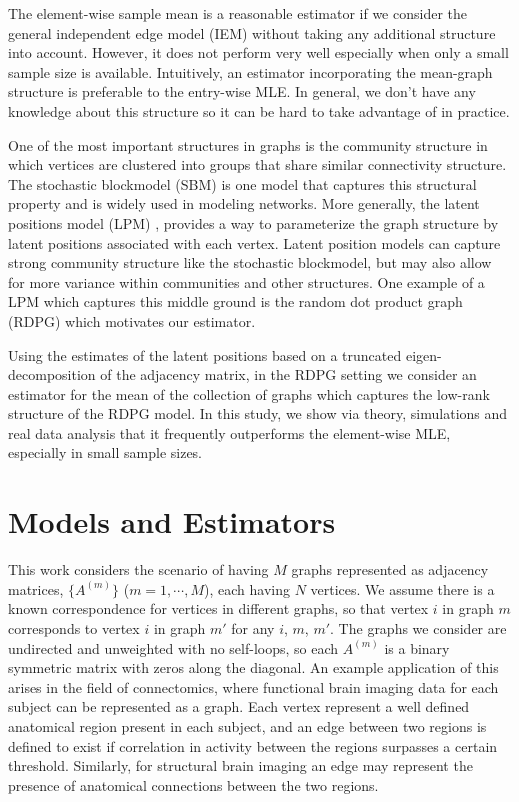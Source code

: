 \documentclass[a4paper]{article}
\begin{document}
The element-wise sample mean is a reasonable estimator if we consider the general independent edge model (IEM) \cite{bollobas2007phase} without taking any additional structure into account. 
However, it does not perform very well especially when only a small sample size is available.
Intuitively, an estimator incorporating the mean-graph structure is preferable to the entry-wise MLE. 
In general, we don't have any knowledge about this structure so it can be hard to take advantage of in practice.



One of the most important structures in graphs is the community structure in which vertices are clustered into groups that share similar connectivity structure. The stochastic blockmodel (SBM) \cite{holland1983stochastic} is one model that captures this structural property and is widely used in modeling networks.
More generally, the latent positions model (LPM) \cite{hoff2002latent}, provides a way to parameterize the graph structure by latent positions associated with each vertex. 
Latent position models can capture strong community structure like the stochastic blockmodel, but may also allow for more variance within communities and other structures.
One example of a LPM which captures this middle ground is the random dot product graph (RDPG) \cite{young2007random, nickel2007random} which motivates our estimator. 

Using the estimates of the latent positions based on a truncated eigen-decomposition of the adjacency matrix,  in the RDPG setting we consider an estimator for the mean of the collection of graphs which captures the low-rank structure of the RDPG model. In this study, we show via theory, simulations and real data analysis that it frequently outperforms the element-wise MLE, especially in small sample sizes.





\section{Models and Estimators}
\label{section:model_estimator}
This work considers the scenario of having $M$ graphs represented as adjacency matrices, $\{A^{(m)}\}$ ($m = 1, \cdots, M$), each having $N$ vertices.
We assume there is a known correspondence for vertices in different graphs, so that vertex $i$ in graph $m$ corresponds to vertex $i$ in graph $m'$ for any $i$, $m$, $m'$.
The graphs we consider are undirected and unweighted with no self-loops, so each $A^{(m)}$ is a binary symmetric matrix with zeros along the diagonal. An example application of this arises in the field of connectomics, where functional brain imaging data for each subject can be represented as a graph.
Each vertex represent a well defined anatomical region present in each subject, and an edge between two regions is defined to exist if correlation in activity between the regions surpasses a certain threshold.
Similarly, for structural brain imaging an edge may represent the presence of anatomical connections between the two regions.
\end{document}
